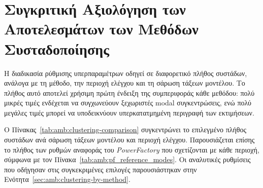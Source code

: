 \begin{table}[htbp]
    \centering
    \caption{Επιλεγμένες ρυθμίσεις AHC.}
    \label{tab:amb:agglomerative-tuning}
\end{table}


\section{Συγκριτική Αξιολόγηση των Αποτελεσμάτων των Μεθόδων Συσταδοποίησης}

Η διαδικασία ρύθμισης υπερπαραμέτρων οδηγεί σε διαφορετικό πλήθος συστάδων, ανάλογα με τη
μέθοδο, την περιοχή ελέγχου και τη σάρωση τάξεων μοντέλου. Το πλήθος αυτό αποτελεί
χρήσιμη πρώτη ένδειξη της συμπεριφοράς κάθε μεθόδου: πολύ μικρές τιμές
ενδέχεται να συγχωνεύουν ξεχωριστές modal συγκεντρώσεις, ενώ πολύ μεγάλες
τιμές μπορεί να υποδεικνύουν υπερκατατμημένη περιγραφή των εκτιμήσεων.

Ο Πίνακας~\ref{tab:amb:clustering-comparison} συγκεντρώνει το επιλεγμένο
πλήθος συστάδων ανά σάρωση τάξεων μοντέλου και περιοχή ελέγχου. Παρουσιάζεται επίσης
το πλήθος των ρυθμών αναφοράς του \textenglish{\textit{PowerFactory}} που σχετίζονται με
κάθε περιοχή, σύμφωνα με τον Πίνακα~\ref{tab:amb:pf_reference_modes}. Οι
αναλυτικές ρυθμίσεις που οδήγησαν στις συγκεκριμένες επιλογές παρουσιάστηκαν
στην Ενότητα~\ref{sec:amb:clustering-by-method}.

